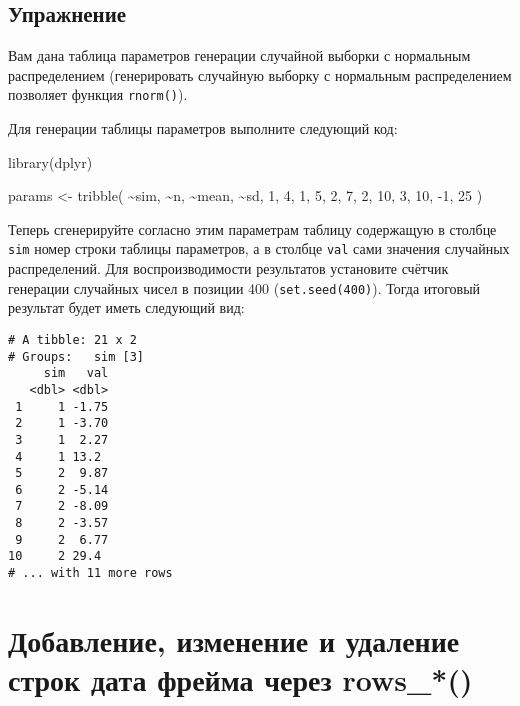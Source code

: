 \documentclass[
]{book}
\newenvironment{Shaded}{\begin{snugshade}}{\end{snugshade}}
\newcommand{\DecValTok}[1]{\textcolor[rgb]{0.00,0.00,0.81}{#1}}
\newcommand{\FunctionTok}[1]{\textcolor[rgb]{0.00,0.00,0.00}{#1}}
\newcommand{\NormalTok}[1]{#1}
\newcommand{\OtherTok}[1]{\textcolor[rgb]{0.56,0.35,0.01}{#1}}
\newcommand{\SpecialCharTok}[1]{\textcolor[rgb]{0.00,0.00,0.00}{#1}}
\begin{document}
\hypertarget{ux443ux43fux440ux430ux436ux43dux435ux43dux438ux435}{%
\section{Упражнение}\label{ux443ux43fux440ux430ux436ux43dux435ux43dux438ux435}}

Вам дана таблица параметров генерации случайной выборки с нормальным распределением (генерировать случайную выборку с нормальным распределением позволяет функция \texttt{rnorm()}).

Для генерации таблицы параметров выполните следующий код:

\begin{Shaded}
\begin{Highlighting}[]
\FunctionTok{library}\NormalTok{(dplyr)}

\NormalTok{params }\OtherTok{\textless{}{-}} \FunctionTok{tribble}\NormalTok{(}
 \SpecialCharTok{\textasciitilde{}}\NormalTok{sim, }\SpecialCharTok{\textasciitilde{}}\NormalTok{n, }\SpecialCharTok{\textasciitilde{}}\NormalTok{mean, }\SpecialCharTok{\textasciitilde{}}\NormalTok{sd,}
    \DecValTok{1}\NormalTok{,  }\DecValTok{4}\NormalTok{,     }\DecValTok{1}\NormalTok{,   }\DecValTok{5}\NormalTok{,}
    \DecValTok{2}\NormalTok{,  }\DecValTok{7}\NormalTok{,     }\DecValTok{2}\NormalTok{,   }\DecValTok{10}\NormalTok{,}
    \DecValTok{3}\NormalTok{,  }\DecValTok{10}\NormalTok{,   }\SpecialCharTok{{-}}\DecValTok{1}\NormalTok{,   }\DecValTok{25}
\NormalTok{)}
\end{Highlighting}
\end{Shaded}

Теперь сгенерируйте согласно этим параметрам таблицу содержащую в столбце \texttt{sim} номер строки таблицы параметров, а в столбце \texttt{val} сами значения случайных распределений. Для воспроизводимости результатов установите счётчик генерации случайных чисел в позиции 400 (\texttt{set.seed(400)}). Тогда итоговый результат будет иметь следующий вид:

\begin{verbatim}
# A tibble: 21 x 2
# Groups:   sim [3]
     sim   val
   <dbl> <dbl>
 1     1 -1.75
 2     1 -3.70
 3     1  2.27
 4     1 13.2 
 5     2  9.87
 6     2 -5.14
 7     2 -8.09
 8     2 -3.57
 9     2  6.77
10     2 29.4 
# ... with 11 more rows
\end{verbatim}

\hypertarget{ux434ux43eux431ux430ux432ux43bux435ux43dux438ux435-ux438ux437ux43cux435ux43dux435ux43dux438ux435-ux438-ux443ux434ux430ux43bux435ux43dux438ux435-ux441ux442ux440ux43eux43a-ux434ux430ux442ux430-ux444ux440ux435ux439ux43cux430-ux447ux435ux440ux435ux437-rows_}{%
\chapter{Добавление, изменение и удаление строк дата фрейма через rows\_*()}\label{ux434ux43eux431ux430ux432ux43bux435ux43dux438ux435-ux438ux437ux43cux435ux43dux435ux43dux438ux435-ux438-ux443ux434ux430ux43bux435ux43dux438ux435-ux441ux442ux440ux43eux43a-ux434ux430ux442ux430-ux444ux440ux435ux439ux43cux430-ux447ux435ux440ux435ux437-rows_}}
\end{document}

